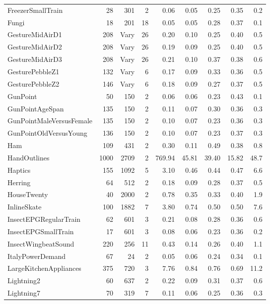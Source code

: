 \documentclass[11pt,landscape]{article}
\begin{document}
\begin{longtable}{lrrrrrrrr}
FreezerSmallTrain & 28 & 301 & 2 & 0.06 & 0.05 & 0.25 & 0.35 & 0.2 \\
Fungi & 18 & 201 & 18 & 0.05 & 0.05 & 0.28 & 0.37 & 0.1 \\
GestureMidAirD1 & 208 & Vary & 26 & 0.20 & 0.10 & 0.25 & 0.40 & 0.5 \\
GestureMidAirD2 & 208 & Vary & 26 & 0.19 & 0.09 & 0.25 & 0.40 & 0.5 \\
GestureMidAirD3 & 208 & Vary & 26 & 0.21 & 0.10 & 0.37 & 0.38 & 0.6 \\
GesturePebbleZ1 & 132 & Vary & 6 & 0.17 & 0.09 & 0.33 & 0.36 & 0.5 \\
GesturePebbleZ2 & 146 & Vary & 6 & 0.18 & 0.09 & 0.27 & 0.37 & 0.5 \\
GunPoint & 50 & 150 & 2 & 0.06 & 0.06 & 0.23 & 0.43 & 0.1 \\
GunPointAgeSpan & 135 & 150 & 2 & 0.11 & 0.07 & 0.30 & 0.36 & 0.3 \\
GunPointMaleVersusFemale & 135 & 150 & 2 & 0.10 & 0.07 & 0.23 & 0.36 & 0.3 \\
GunPointOldVersusYoung & 136 & 150 & 2 & 0.10 & 0.07 & 0.23 & 0.37 & 0.3 \\
Ham & 109 & 431 & 2 & 0.30 & 0.11 & 0.49 & 0.38 & 0.8 \\
\rowcolor{fastrow}HandOutlines & 1000 & 2709 & 2 & 769.94 & 45.81 & 39.40 & 15.82 & 48.7 \\
Haptics & 155 & 1092 & 5 & 3.10 & 0.46 & 0.44 & 0.47 & 6.6 \\
Herring & 64 & 512 & 2 & 0.18 & 0.09 & 0.28 & 0.37 & 0.5 \\
HouseTwenty & 40 & 2000 & 2 & 0.78 & 0.35 & 0.33 & 0.40 & 1.9 \\
InlineSkate & 100 & 1882 & 7 & 3.80 & 0.74 & 0.50 & 0.50 & 7.6 \\
InsectEPGRegularTrain & 62 & 601 & 3 & 0.21 & 0.08 & 0.28 & 0.36 & 0.6 \\
InsectEPGSmallTrain & 17 & 601 & 3 & 0.08 & 0.06 & 0.23 & 0.36 & 0.2 \\
InsectWingbeatSound & 220 & 256 & 11 & 0.43 & 0.14 & 0.26 & 0.40 & 1.1 \\
ItalyPowerDemand & 67 & 24 & 2 & 0.05 & 0.06 & 0.24 & 0.34 & 0.1 \\
LargeKitchenAppliances & 375 & 720 & 3 & 7.76 & 0.84 & 0.76 & 0.69 & 11.2 \\
Lightning2 & 60 & 637 & 2 & 0.22 & 0.09 & 0.31 & 0.37 & 0.6 \\
Lightning7 & 70 & 319 & 7 & 0.11 & 0.06 & 0.25 & 0.36 & 0.3 \\

\end{longtable}
\end{document}
